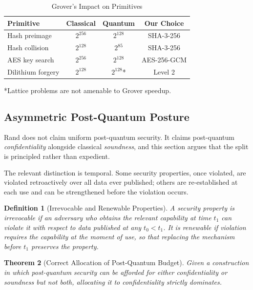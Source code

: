 \documentclass[11pt,a4paper]{article}
\newtheorem{theorem}{Theorem}[section]
\newtheorem{definition}[theorem]{Definition}
\begin{document}
\begin{table}[h]
\centering
\caption{Grover's Impact on Primitives}
\begin{tabular}{@{}lccc@{}}
\toprule
\textbf{Primitive} & \textbf{Classical} & \textbf{Quantum} & \textbf{Our Choice} \\ \midrule
Hash preimage & $2^{256}$ & $2^{128}$ & SHA-3-256 \\
Hash collision & $2^{128}$ & $2^{85}$ & SHA-3-256 \\
AES key search & $2^{256}$ & $2^{128}$ & AES-256-GCM \\
Dilithium forgery & $2^{128}$ & $2^{128}$* & Level 2 \\ \bottomrule
\end{tabular}
\end{table}

*Lattice problems are not amenable to Grover speedup.

\subsection{Asymmetric Post-Quantum Posture}
\label{sec:asym}

Rand does not claim uniform post-quantum security. It claims post-quantum \emph{confidentiality} alongside classical \emph{soundness}, and this section argues that the split is principled rather than expedient.

The relevant distinction is temporal. Some security properties, once violated, are violated retroactively over all data ever published; others are re-established at each use and can be strengthened before the violation occurs.

\begin{definition}[Irrevocable and Renewable Properties]
A security property is \emph{irrevocable} if an adversary who obtains the relevant capability at time $t_1$ can violate it with respect to data published at any $t_0 < t_1$. It is \emph{renewable} if violation requires the capability at the moment of use, so that replacing the mechanism before $t_1$ preserves the property.
\end{definition}

\begin{theorem}[Correct Allocation of Post-Quantum Budget]
\label{thm:alloc}
Given a construction in which post-quantum security can be afforded for either confidentiality or soundness but not both, allocating it to confidentiality strictly dominates.
\end{theorem}
\end{document}
